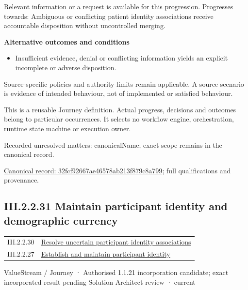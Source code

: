 Relevant information or a request is available for this progression. Progresses towards: Ambiguous or conflicting patient identity associations receive accountable disposition without uncontrolled merging.



\par\medskip\textbf{Alternative outcomes and conditions}\par


\begin{itemize}


\item Insufficient evidence, denial or conflicting information yields an explicit incomplete or adverse disposition.

\end{itemize}


Source-specific policies and authority limits remain applicable. A source scenario is evidence of intended behaviour, not of implemented or satisfied behaviour.



This is a reusable Journey definition. Actual progress, decisions and outcomes belong to particular occurrences. It selects no workflow engine, orchestration, runtime state machine or execution owner.


{\small Recorded unresolved matters: canonicalName; exact scope remains in the canonical record.}\par
{\footnotesize \href{../../../../../../../continuum/strategy/value-stream/32fcf92667ae46578ab213f879c8a799.md}{Canonical record: 32fcf92667ae46578ab213f879c8a799}; full qualifications and provenance.}\par
\subsection*{III.2.2.31 Maintain participant identity and demographic currency}
\label{navigation:III.2.2.31}

\begin{longtable}{p{.22\linewidth}p{.73\linewidth}}
III.2.2.30 & \hyperref[element:32fcf92667ae46578ab213f879c8a799]{Resolve uncertain participant identity associations} \\
III.2.2.27 & \hyperref[element:f0ce31d5b71c4c5ab37ade566b224808]{Establish and maintain participant identity} \\
\end{longtable}
\label{element:393b2a5eeda94c36841c2673ca1f391e}
{\small ValueStream / Journey · Authorised 1.1.21 incorporation candidate; exact incorporated result pending Solution Architect review · current}\par

